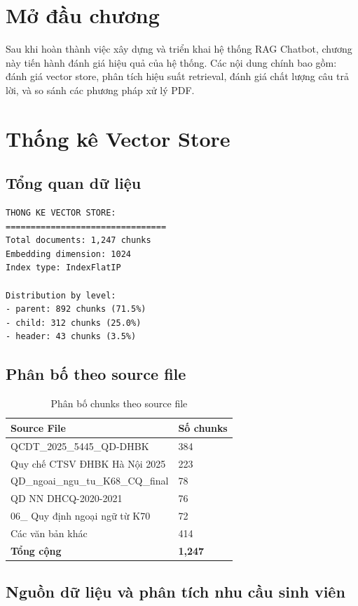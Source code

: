 \documentclass[../DoAn.tex]{subfiles}
\begin{document}
\section{Mở đầu chương}
Sau khi hoàn thành việc xây dựng và triển khai hệ thống RAG Chatbot, chương này tiến hành đánh giá hiệu quả của hệ thống. Các nội dung chính bao gồm: đánh giá vector store, phân tích hiệu suất retrieval, đánh giá chất lượng câu trả lời, và so sánh các phương pháp xử lý PDF.

\section{Thống kê Vector Store}

\subsection{Tổng quan dữ liệu}
\begin{verbatim}
THONG KE VECTOR STORE:
================================
Total documents: 1,247 chunks
Embedding dimension: 1024
Index type: IndexFlatIP

Distribution by level:
- parent: 892 chunks (71.5%)
- child: 312 chunks (25.0%)
- header: 43 chunks (3.5%)
\end{verbatim}

\subsection{Phân bố theo source file}
\begin{table}[h]
\centering
\begin{tabular}{|l|l|}
\hline
\textbf{Source File} & \textbf{Số chunks} \\
\hline
QCDT\_2025\_5445\_QD-DHBK & 384 \\
\hline
Quy chế CTSV ĐHBK Hà Nội 2025 & 223 \\
\hline
QD\_ngoai\_ngu\_tu\_K68\_CQ\_final & 78 \\
\hline
QD NN DHCQ-2020-2021 & 76 \\
\hline
06\_ Quy định ngoại ngữ từ K70 & 72 \\
\hline
Các văn bản khác & 414 \\
\hline
\textbf{Tổng cộng} & \textbf{1,247} \\
\hline
\end{tabular}
\caption{Phân bố chunks theo source file}
\end{table}

\subsection{Nguồn dữ liệu và phân tích nhu cầu sinh viên}
\end{document}
